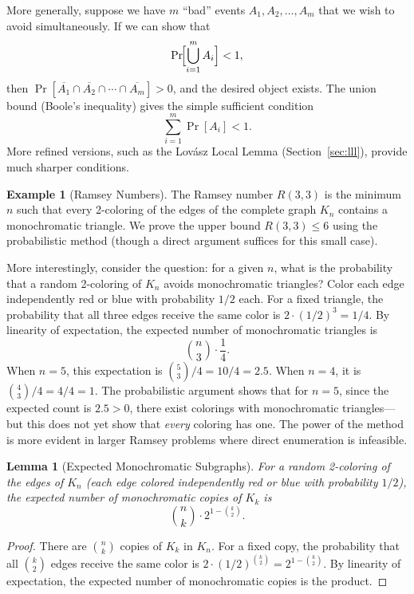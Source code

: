 \documentclass[twoside,12pt]{book}
\theoremstyle{plain}
\newtheorem{lemma}[theorem]{Lemma}
\theoremstyle{definition}
\newtheorem{example}[theorem]{Example}
\theoremstyle{remark}
\begin{document}
More generally, suppose we have $m$ ``bad'' events $A_1, A_2, \ldots, A_m$
that we wish to avoid simultaneously. If we can show that
\[
\Pr\!\Bigl[\bigcup_{i=1}^{m} A_i\Bigr] < 1,
\]
then $\Pr[\overline{A_1} \cap \overline{A_2} \cap \cdots \cap \overline{A_m}]
> 0$, and the desired object exists. The union bound (Boole's inequality)
gives the simple sufficient condition
\[
\sum_{i=1}^{m} \Pr[A_i] < 1.
\]
More refined versions, such as the Lov\'{a}sz Local Lemma (Section~\ref{sec:lll}),
provide much sharper conditions.

\begin{example}[Ramsey Numbers]
\label{ex:ramsey}
The Ramsey number $R(3,3)$ is the minimum $n$ such that every 2-coloring
of the edges of the complete graph $K_n$ contains a monochromatic triangle.
We prove the upper bound $R(3,3) \leq 6$ using the probabilistic method
(though a direct argument suffices for this small case).

More interestingly, consider the question: for a given $n$, what is the
probability that a random 2-coloring of $K_n$ avoids monochromatic
triangles? Color each edge independently red or blue with probability
$1/2$ each. For a fixed triangle, the probability that all three edges
receive the same color is $2 \cdot (1/2)^3 = 1/4$. By linearity of
expectation, the expected number of monochromatic triangles is
\[
\binom{n}{3} \cdot \frac{1}{4}.
\]
When $n = 5$, this expectation is $\binom{5}{3}/4 = 10/4 = 2.5$. When
$n = 4$, it is $\binom{4}{3}/4 = 4/4 = 1$. The probabilistic argument
shows that for $n = 5$, since the expected count is $2.5 > 0$, there
exist colorings with monochromatic triangles---but this does not yet show
that \emph{every} coloring has one. The power of the method is more
evident in larger Ramsey problems where direct enumeration is infeasible.
\end{example}

\begin{lemma}[Expected Monochromatic Subgraphs]
\label{lem:monochromatic}
For a random 2-coloring of the edges of $K_n$ (each edge colored independently
red or blue with probability $1/2$), the expected number of monochromatic
copies of $K_k$ is
\[
\binom{n}{k} \cdot 2^{1 - \binom{k}{2}}.
\]
\end{lemma}

\begin{proof}
There are $\binom{n}{k}$ copies of $K_k$ in $K_n$. For a fixed copy, the
probability that all $\binom{k}{2}$ edges receive the same color is
$2 \cdot (1/2)^{\binom{k}{2}} = 2^{1 - \binom{k}{2}}$. By linearity of
expectation, the expected number of monochromatic copies is the product.
\end{proof}
\end{document}

